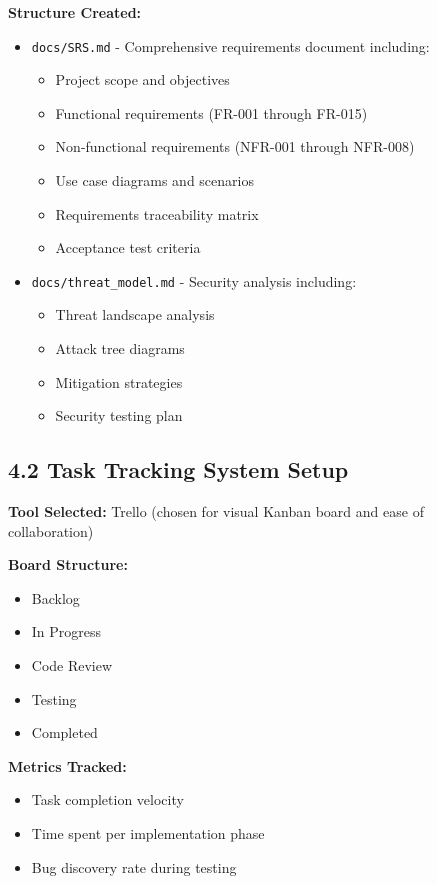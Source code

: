 \documentclass[a4paper,11pt]{article}
\begin{document}
\textbf{Structure Created:}
\begin{itemize}[leftmargin=*]
    \item \texttt{docs/SRS.md} - Comprehensive requirements document including:
    \begin{itemize}
        \item Project scope and objectives
        \item Functional requirements (FR-001 through FR-015)
        \item Non-functional requirements (NFR-001 through NFR-008)
        \item Use case diagrams and scenarios
        \item Requirements traceability matrix
        \item Acceptance test criteria
    \end{itemize}
    \item \texttt{docs/threat\_model.md} - Security analysis including:
    \begin{itemize}
        \item Threat landscape analysis
        \item Attack tree diagrams
        \item Mitigation strategies
        \item Security testing plan
    \end{itemize}
\end{itemize}

\subsection{4.2 Task Tracking System Setup}

\textbf{Tool Selected:} Trello (chosen for visual Kanban board and ease of collaboration)

\textbf{Board Structure:}
\begin{itemize}[leftmargin=*]
    \item Backlog
    \item In Progress
    \item Code Review
    \item Testing
    \item Completed
\end{itemize}

\textbf{Metrics Tracked:}
\begin{itemize}[leftmargin=*]
    \item Task completion velocity
    \item Time spent per implementation phase
    \item Bug discovery rate during testing
\end{itemize}
\end{document}
